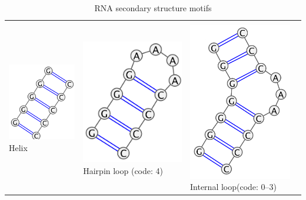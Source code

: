 \documentclass[12pt]{article}
\begin{document}
\begin{table}
\caption{RNA secondary structure motifs}
\label{RNAsecondaryStructures}
\begin{tabular}
{ >{\centering} p{5.5cm} >{\centering} p{5.5cm} >{\centering} p{5.5cm}}
&& \tabularnewline
 \includegraphics[width=4.5cm]{./pictures/helix_varna.PNG}  \linebreak Helix 
 & \includegraphics[width=4.5cm]{./pictures/hairpin_varna.PNG}  Hairpin loop \linebreak (code: 4) &  \includegraphics[width=4.5cm]{./pictures/bulge_varna.PNG} Internal loop\linebreak  (code: 0--3) \tabularnewline

\end{tabular}
\end{table}
\end{document}
